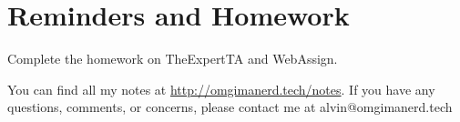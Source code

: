 \documentclass{math}
\begin{document}
\section*{Reminders and Homework}
Complete the homework on TheExpertTA and WebAssign.

\begin{center}
  You can find all my notes at \url{http://omgimanerd.tech/notes}. If you have
  any questions, comments, or concerns, please contact me at
  alvin@omgimanerd.tech
\end{center}
\end{document}

